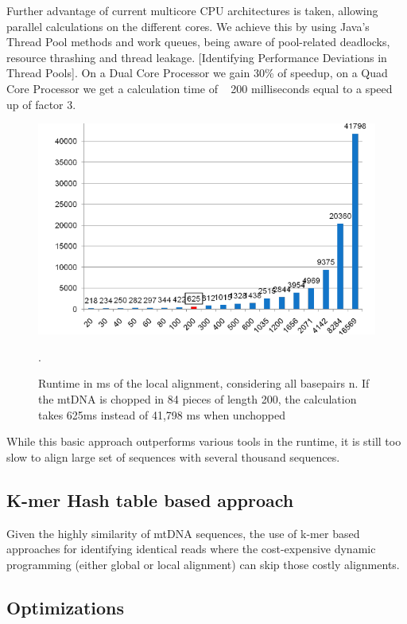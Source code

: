 Further advantage of current multicore CPU architectures is taken, allowing parallel calculations on the different cores. We achieve this by using Java’s Thread Pool methods and work queues, being aware of pool-related deadlocks, resource thrashing and thread leakage. [Identifying Performance Deviations in Thread Pools]. On a Dual Core Processor we gain 30\% of speedup, on a Quad Core Processor we get a calculation time of ~ 200 milliseconds equal to a speed up of factor 3.
\begin{figure}[!ht]
\label{fig:local}
    \centering
    \includegraphics[width=1\textwidth]{images/runtimeSW.png}
    \caption[Runtime in ms of Gotoh for n/i ]{Runtime in ms of the local alignment, considering all basepairs n. If the mtDNA is chopped in 84 pieces of length 200, the calculation takes 625ms instead of 41,798 ms when unchopped}. 
\end{figure}
While this basic approach outperforms various tools in the runtime, it is still too slow to align large set of sequences with several thousand sequences. 
\subsection{K-mer Hash table based approach}
Given the highly similarity of mtDNA sequences, the use of k-mer based approaches for identifying identical reads where the cost-expensive dynamic programming (either global or local alignment) can skip those costly alignments. 
\subsection{Optimizations}\label{align:optim}
